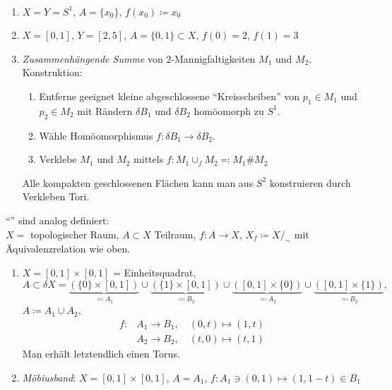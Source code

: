 \begin{example} \
  \begin{enumerate}
    \item $ X = Y = S^1 $, $ A = \{ x_0 \} $, $ f(x_0) \coloneqq x_0 $
    \item $ X = [0,1] $, $ Y = [2,5] $, $ A = \{ 0,1 \} \subset X $, $ f(0) = 2 $, $ f(1) = 3 $
    \item \emph{Zusammenhängende Summe} von $ 2 $-Mannigfaltigkeiten $ M_1 $ und $ M_2 $.
      \\
      Konstruktion:
      \begin{enumerate}
        \item Entferne geeignet kleine abgeschlossene ``Kreisscheiben'' von $ p_1 \in M_1 $ und $ p_2 \in M_2 $ mit Rändern $ \delta B_1 $ und $ \delta B_2 $ homöomorph zu $ S^1 $.
        \item Wähle Homöomorphismus $ f: \delta B_1 \to \delta B_2 $.
        \item Verklebe $ M_1 $ und $ M_2 $ mittels $ f : M_1 \cup_f M_2 \eqqcolon M_1 \# M_2 $
      \end{enumerate}
      Alle kompakten geschlossenen Flächen kann man aus $ S^2 $ konstruieren durch Verkleben Tori.
  \end{enumerate}
\end{example}

\begin{remark}[Selbstverklebungen]
  ``''\label{def:selbstverklebung} sind analog definiert: \\
  $ X = $ topologischer Raum, $ A \subset X $ Teilraum, $ f : A \to X $, $ X_f \coloneqq X/_\sim $ mit Äquivalenzrelation wie oben.
\end{remark}

\begin{example}
  \begin{enumerate}
    \item $ X = [0,1] \times [0,1] $ = Einheitsquadrat,
      \begin{equation*}
        A \subset \delta X = \underbrace{\left( \{ 0 \} \times [0,1] \right)}_{\eqqcolon A_1} \cup \underbrace{\left( \{ 1 \} \times [0,1] \right)}_{\eqqcolon B_2} \cup \underbrace{\left( [0,1] \times \{ 0 \} \right)}_{\eqqcolon A_2} \cup \underbrace{\left( [0,1] \times \{ 1 \} \right)}_{\eqqcolon B_2}\text{,}
      \end{equation*}
      $ A \coloneqq A_1 \cup A_2 $,
      \begin{align*}
        f: &A_1 \to B_1, \quad (0,t) \mapsto (1,t) \\
         &A_2 \to B_2, \quad (t,0) \mapsto (t,1)
      \end{align*}
      Man erhält letztendlich einen Torus.
    \item \emph{Möbiusband}: $ X = [0,1] \times [0,1] $, $ A = A_1 $, $ f: A_1 \ni (0,1) \mapsto (1,1-t) \in B_1 $
  \end{enumerate}
\end{example}
